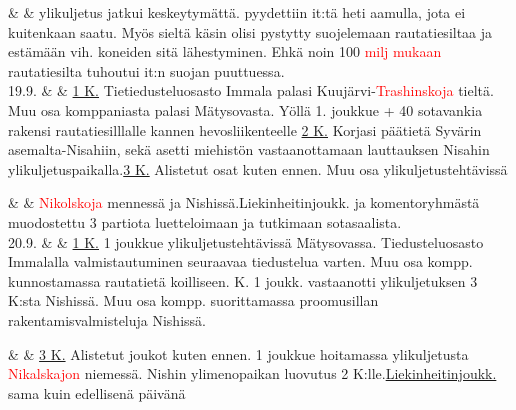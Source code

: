 \documentclass[11pt,a5paper,oneside]{book}
\begin{document}
\newpage

& & ylikuljetus jatkui keskeytymättä. pyydettiin it:tä heti aamulla, jota ei kuitenkaan saatu. Myös sieltä käsin olisi pystytty suojelemaan rautatiesiltaa ja estämään vih. koneiden sitä lähestyminen. Ehkä noin 100 \textcolor{red}{milj mukaan} rautatiesilta tuhoutui it:n suojan puuttuessa. \newline\newline\newline \\

19.9. & & \underline{1 K.} Tietiedusteluosasto Immala palasi Kuujärvi-\textcolor{red}{Trashinskoja} tieltä. Muu osa komppaniasta palasi Mätysovasta. Yöllä 1. joukkue + 40 sotavankia rakensi rautatiesilllalle kannen hevosliikenteelle \newline \underline{2 K.} Korjasi päätietä Syvärin asemalta-Nisahiin, sekä asetti miehistön vastaanottamaan lauttauksen Nisahin ylikuljetuspaikalla.\newline\newline \underline{3 K.} Alistetut osat kuten ennen. Muu osa ylikuljetustehtävissä \\

\taulustop


& & \textcolor{red}{Nikolskoja} mennessä ja Nishissä.\newline\newline Liekinheitinjoukk. ja komentoryhmästä muodostettu 3 partiota luetteloimaan ja tutkimaan sotasaalista.\newline\newline\newline\newline \\

20.9. & & \underline{1 K.} 1 joukkue ylikuljetustehtävissä Mätysovassa. Tiedusteluosasto Immalalla valmistautuminen seuraavaa tiedustelua varten. Muu osa kompp. kunnostamassa rautatietä koilliseen.\newline{} K. 1 joukk. vastaanotti ylikuljetuksen 3 K:sta Nishissä. Muu osa kompp. suorittamassa proomusillan rakentamisvalmisteluja Nishissä. \\

\newpage

& & \underline{3 K.} Alistetut joukot kuten ennen. 1 joukkue hoitamassa ylikuljetusta \textcolor{red}{Nikalskajon} niemessä. Nishin ylimenopaikan luovutus 2 K:lle.\newline\newline \underline{Liekinheitinjoukk.} sama kuin edellisenä päivänä \newline\newline \\
\end{document}
